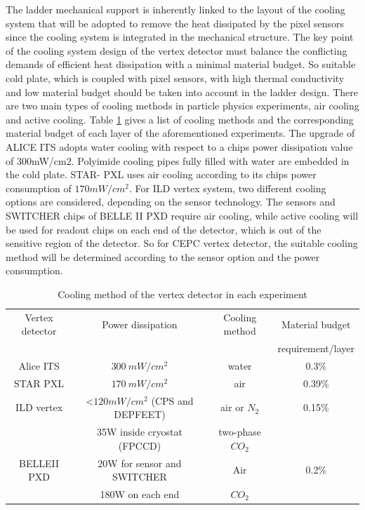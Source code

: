 The ladder mechanical support is inherently linked to the layout of the cooling system that will be adopted to remove the heat dissipated by the pixel sensors since the cooling system is integrated in the mechanical structure. The key point of the cooling system design of the vertex detector must balance the conflicting demands of efficient heat dissipation with a minimal material budget. So suitable cold plate, which is coupled with pixel sensors, with high thermal conductivity and low material budget should be taken into account in the ladder design. There are two main types of cooling methods in particle physics experiments, air cooling and active cooling. Table \ref{tab:cooling} gives a list of cooling methods and the corresponding material budget of each layer of the aforementioned experiments. The upgrade of ALICE ITS \cite{abelev2014technical} adopts water cooling with respect to a chips power dissipation value of 300mW/cm2. Polyimide cooling pipes fully filled with water are embedded in the cold plate. STAR- PXL \cite{wieman2009star} uses air cooling according to its chips power consumption of $170mW/cm^{2}$. For ILD \cite{Behnke_2013} vertex system, two different cooling options are considered, depending on the sensor technology. The sensors and SWITCHER chips of BELLE II PXD \cite{abeoctober} require air cooling, while active cooling will be used for readout chips on each end of the detector, which is out of the sensitive region of the detector. So for CEPC vertex detector, the suitable cooling method will be determined according to the sensor option and the power consumption.
\begin{table}[!h]
	\centering
	\begin{tabular}{c c c c}
		\hline
		Vertex detector & Power dissipation & Cooling method & Material budget \\
		& & & requirement/layer \\
		\hline
		Alice ITS & $300\ mW/cm^2$ & water & 0.3\% \\
		\hline
		STAR PXL & $170\ mW/cm^2$ & air &  0.39\% \\
		\hline
		ILD vertex & <$120 mW/cm^2$ (CPS and DEPFEET) & air or $N_2$ & 0.15\% \\
		& 35W inside cryostat (FPCCD) & two-phase $CO_2$ & \\
		\hline
		BELLEII PXD & 20W for sensor and SWITCHER & Air & 0.2\% \\
		& 180W on each end & $CO_2$ & \\
		\hline
	\end{tabular}
	\caption{Cooling method of the vertex detector in each experiment}
	\label{tab:cooling}
\end{table}


